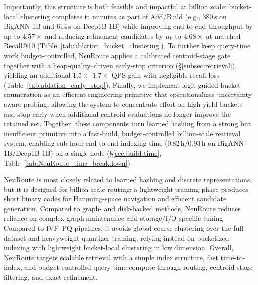 \documentclass[sigconf, nonacm]{acmart}
\begin{document}
Importantly, this structure is both feasible and impactful at billion scale: bucket-local clustering completes in minutes as part of Add/Build (e.g., 380\,s on BigANN-1B and 614\,s on Deep1B-1B) while improving end-to-end throughput by up to $4.57\times$ and reducing refinement candidates by up to $4.68\times$ at matched Recall@10 (Table~\ref{tab:ablation_bucket_clustering}).
To further keep query-time work budget-controlled, NeuRoute applies a calibrated centroid-stage gate together with a heap-quality--driven early-stop criterion (\S\ref{subsec:retrieval}), yielding an additional $1.5\times$--$1.7\times$ QPS gain with negligible recall loss (Table~\ref{tab:ablation_early_stop}).
Finally, we implement logit-guided bucket enumeration as an efficient engineering primitive that operationalizes uncertainty-aware probing, allowing the system to concentrate effort on high-yield buckets and stop early when additional centroid evaluations no longer improve the retained set.
Together, these components turn learned hashing from a strong but insufficient primitive into a fast-build, budget-controlled billion-scale retrieval system, enabling sub-hour end-to-end indexing time (0.82\,h/0.93\,h on BigANN-1B/Deep1B-1B) on a single node (\S\ref{sec:build-time}, Table~\ref{tab:NeuRoute_time_breakdown}).

NeuRoute is most closely related to learned hashing and discrete representations, but it is designed for billion-scale routing: a lightweight training phase produces short binary codes for Hamming-space navigation and efficient candidate generation.
Compared to graph- and disk-backed methods, NeuRoute reduces reliance on complex graph maintenance and storage/I/O-specific tuning.
Compared to IVF--PQ pipelines, it avoids global coarse clustering over the full dataset and heavyweight quantizer training, relying instead on bucketized indexing with lightweight bucket-local clustering in low dimension.
Overall, NeuRoute targets scalable retrieval with a simple index structure, fast time-to-index, and budget-controlled query-time compute through routing, centroid-stage filtering, and exact refinement.
\end{document}
